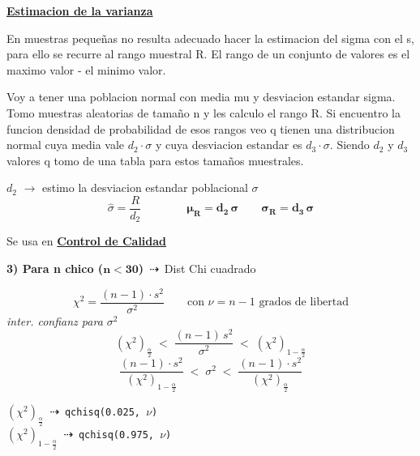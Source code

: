 \documentclass[10pt,a4paper]{article}
\begin{document}
{\large\bfseries\uline{Estimacion de la varianza}\par}
\vspace{2pt}

En muestras pequeñas no resulta adecuado hacer la estimacion del sigma con el s, para ello se recurre al rango muestral R. El rango de un conjunto de valores es el maximo valor - el minimo valor.

Voy a tener una poblacion normal con media mu y desviacion estandar sigma. Tomo muestras aleatorias de tamaño n y les calculo el rango R. Si encuentro la funcion densidad de probabilidad de esos rangos veo q tienen una distribucion normal cuya media vale $d_2\cdot\sigma$ y cuya desviacion estandar es $d_3\cdot\sigma$. Siendo $d_2$ y $d_3$ valores q tomo de una tabla para estos tamaños muestrales.

$d_2$ $\rightarrow$ estimo la desviacion estandar poblacional $\sigma$
\[
\hat{\sigma} = \frac{R}{d_2}
\qquad\qquad
\boldsymbol{\mu_R = d_2\,\sigma} \qquad \boldsymbol{\sigma_R = d_3\,\sigma}
\]

Se usa en \textbf{\uline{Control de Calidad}}

\vspace{2pt}
\textbf{3) Para n chico ($\mathbf{n<30}$)} \,$\dashrightarrow$\, Dist Chi cuadrado

\noindent
\begin{minipage}[t]{0.58\textwidth}
\[
\chi^2 = \frac{(n-1)\cdot s^2}{\sigma^2} \qquad \text{con } \nu = n-1 \text{ grados de libertad}
\]
{\footnotesize\textit{inter. confianz para $\sigma^2$}}
\[
(\chi^2)_{\frac{\alpha}{2}} \;<\; \frac{(n-1)\,s^2}{\sigma^2} \;<\; (\chi^2)_{1-\frac{\alpha}{2}}
\]
\[
\frac{(n-1)\cdot s^2}{(\chi^2)_{1-\frac{\alpha}{2}}} \;<\; \sigma^2 \;<\; \frac{(n-1)\cdot s^2}{(\chi^2)_{\frac{\alpha}{2}}}
\]
\end{minipage}\hfill
\begin{minipage}[t]{0.40\textwidth}
\vspace{2pt}
\begin{center}
\end{center}
\vspace{-4pt}
{\footnotesize
$(\chi^2)_{\frac{\alpha}{2}}$ \,$\dashrightarrow$\, \texttt{qchisq(0.025, $\nu$)}\\
$(\chi^2)_{1-\frac{\alpha}{2}}$ \,$\dashrightarrow$\, \texttt{qchisq(0.975, $\nu$)}
}
\end{minipage}
\end{document}
